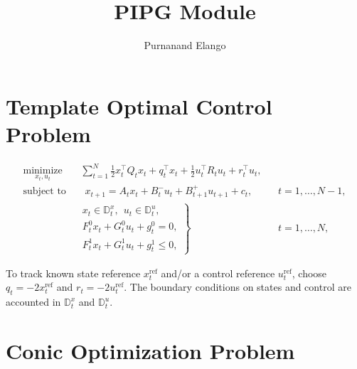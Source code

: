 \documentclass[letterpaper,11pt]{article}
\title{PIPG Module}
\author{Purnanand Elango}
\begin{document}
\maketitle 

\section{Template Optimal Control Problem}


\begin{align*}
    \underset{x_t,u_t}{\operatorname{minimize}}~~&~\sum_{t=1}^N\frac{1}{2}x_t^\top Q_t x_t +q_t^\top x_t + \frac{1}{2}u_t^\top R_t u_t + r_t^\top u_t,\\
    \operatorname{subject~to}~~&~~~x_{t+1} = A_t x_t + B_t^{-}u_t + B_{t+1}^+u_{t+1} + c_t, & & t = 1,\ldots,N-1,\\
        & \left. \begin{array}{l} 
        x_t\in\mathbb{D}^x_t,~~u_t \in \mathbb{D}^u_t,\\[0.1cm]
        F^0_t x_t + G^0_t u_t + g^0_t = 0, \\[0.1cm]
        F^1_t x_t + G^1_t u_t + g^1_t \le 0, \end{array} \right\} & & t = 1,\ldots, N,  
\end{align*}

To track known state reference $x_t^{\text{ref}}$ and/or a control reference $u^{\text{ref}}_t$, choose $q_t = -2x_t^{\text{ref}}$ and $r_t = -2u^{\text{ref}}_t$. The boundary conditions on states and control are accounted in $\mathbb{D}^x_t$ and $\mathbb{D}^u_t$.

\section{Conic Optimization Problem}
\end{document}
